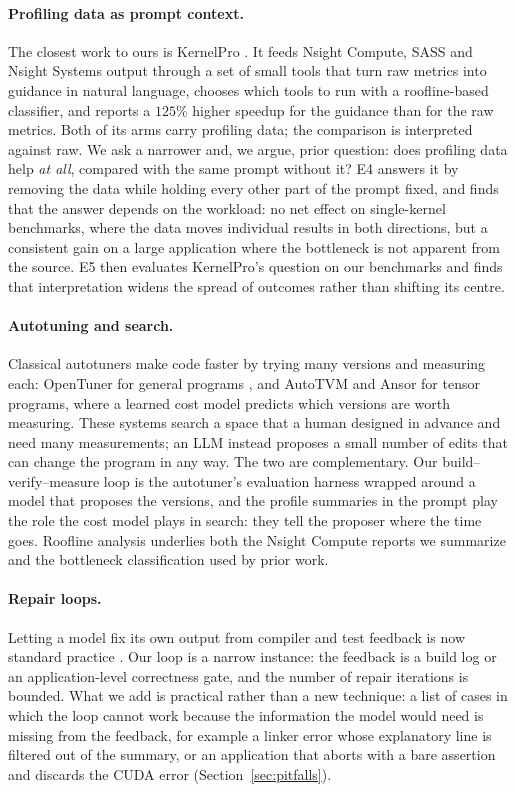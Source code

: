 \paragraph{Profiling data as prompt context.}
The closest work to ours is KernelPro \cite{gai2026kernelpro}. It feeds Nsight Compute, SASS and
Nsight Systems output through a set of small tools that turn raw metrics into guidance in natural
language, chooses which tools to run with a roofline-based classifier, and reports a $125\%$ higher
speedup for the guidance than for the raw metrics. Both of its arms carry profiling data; the
comparison is interpreted against raw. We ask a narrower and, we argue, prior question: does profiling
data help \emph{at all}, compared with the same prompt without it? E4 answers it by removing the data
while holding every other part of the prompt fixed, and finds that the answer depends on the workload:
no net effect on single-kernel benchmarks, where the data moves individual results in both directions,
but a consistent gain on a large application where the bottleneck is not apparent from the source. E5
then evaluates KernelPro's question on our benchmarks and finds that interpretation widens the spread
of outcomes rather than shifting its centre.

\paragraph{Autotuning and search.}
Classical autotuners make code faster by trying many versions and measuring each: OpenTuner for
general programs \cite{ansel2014opentuner}, and AutoTVM \cite{chen2018autotvm} and Ansor
\cite{zheng2020ansor} for tensor programs, where a learned cost model predicts which versions are
worth measuring. These systems search a space that a human designed in advance and need many
measurements; an LLM instead proposes a small number of edits that can change the program in any way.
The two are complementary. Our build--verify--measure loop is the autotuner's evaluation harness
wrapped around a model that proposes the versions, and the profile summaries in the prompt play the
role the cost model plays in search: they tell the proposer where the time goes. Roofline analysis
\cite{williams2009roofline} underlies both the Nsight Compute reports we summarize and the bottleneck
classification used by prior work.

\paragraph{Repair loops.}
Letting a model fix its own output from compiler and test feedback is now standard practice
\cite{chen2024selfdebug}. Our loop is a narrow instance: the feedback is a build log or an
application-level correctness gate, and the number of repair iterations is bounded. What we add is
practical rather than a new technique: a list of cases in which the loop cannot work because the
information the model would need is missing from the feedback, for example a linker error whose
explanatory line is filtered out of the summary, or an application that aborts with a bare assertion
and discards the CUDA error (Section~\ref{sec:pitfalls}).

